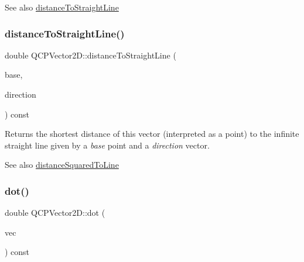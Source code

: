 \begin{DoxySeeAlso}{See also}
\hyperlink{classQCPVector2D_ae240b845c3744e43a5d0aa7b2bb66c19}{distance\+To\+Straight\+Line} 
\end{DoxySeeAlso}
\mbox{\label{classQCPVector2D_ae240b845c3744e43a5d0aa7b2bb66c19}} 
\subsubsection{\texorpdfstring{distance\+To\+Straight\+Line()}{distanceToStraightLine()}}
{\footnotesize\ttfamily double Q\+C\+P\+Vector2\+D\+::distance\+To\+Straight\+Line (\begin{DoxyParamCaption}\item[{const \hyperlink{classQCPVector2D}{Q\+C\+P\+Vector2D} \&}]{base,  }\item[{const \hyperlink{classQCPVector2D}{Q\+C\+P\+Vector2D} \&}]{direction }\end{DoxyParamCaption}) const}

Returns the shortest distance of this vector (interpreted as a point) to the infinite straight line given by a {\itshape base} point and a {\itshape direction} vector.

\begin{DoxySeeAlso}{See also}
\hyperlink{classQCPVector2D_a14840cd3da80cfee4eb3f8977cab89ab}{distance\+Squared\+To\+Line} 
\end{DoxySeeAlso}
\mbox{\label{classQCPVector2D_a39f8d28db7dbffcca6aa63a1f1f6e176}} 
\subsubsection{\texorpdfstring{dot()}{dot()}}
{\footnotesize\ttfamily double Q\+C\+P\+Vector2\+D\+::dot (\begin{DoxyParamCaption}\item[{const \hyperlink{classQCPVector2D}{Q\+C\+P\+Vector2D} \&}]{vec }\end{DoxyParamCaption}) const\hspace{0.3cm}{\ttfamily [inline]}}

